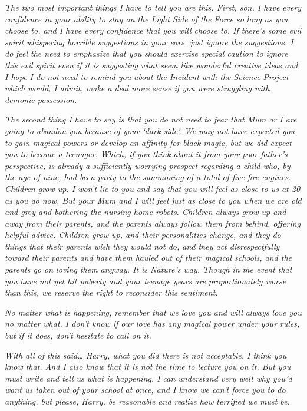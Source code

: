 \emph{The two most important things I have to tell you are this. First,
son, I have} \emph{every} \emph{confidence in your ability to stay on
the Light Side of the Force so long as you choose to, and I have every
confidence that you will choose to. If there's some evil spirit
whispering horrible suggestions in your ears, just ignore the
suggestions. I} \emph{do} \emph{feel the need to emphasize that you
should exercise special caution to ignore this evil spirit even if it is
suggesting what seem like wonderful creative ideas and I hope I do not
need to remind you about the Incident with the Science Project which
would, I admit, make a deal more sense if you were struggling with
demonic possession.}

\emph{The second thing I have to say is that you do not need to fear
that Mum or I are going to abandon you because of your `dark side'. We
may not have expected you to gain magical powers or develop an affinity
for black magic, but we did expect you to become a teenager. Which, if
you think about it from your poor father's perspective, is already a
sufficiently worrying prospect regarding a child who, by the age of
nine, had been party to the summoning of a total of five fire engines.
Children grow up. I won't lie to you and say that you will feel as close
to us at 20 as you do now. But your Mum and I will feel just as close to
you when we are old and grey and bothering the nursing-home robots.
Children always grow up and away from their parents, and the parents
always follow them from behind, offering helpful advice. Children grow
up, and their personalities change, and they do things that their
parents wish they would not do, and they act disrespectfully toward
their parents and have them hauled out of their magical schools, and the
parents go on loving them anyway. It is Nature's way. Though in the
event that you have not yet hit puberty and your teenage years are
proportionately worse than this, we reserve the right to reconsider this
sentiment.}

\emph{No matter what is happening, remember that we love you and will
always love you no matter what. I don't know if our love has any magical
power under your rules, but if it does, don't hesitate to call on it.}

\emph{With all of this said\ldots{} Harry, what you did there is not
acceptable. I think you know that. And I also know that it is not the
time to lecture you on it. But you must write and tell us what is
happening. I can understand very well why you'd want us taken out of
your school at once, and I know we can't force you to do anything, but
please, Harry, be reasonable and realize how terrified we must be.}

